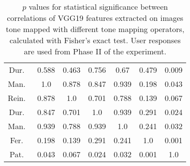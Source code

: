 \begin{table}[ht]
{\begin{tabular}{c|c c c c c c}
Dur.~\cite{durand2002fast}  &0.588 &0.463 &0.756 &0.67 &0.479 &0.009 \\ 
Man.~\cite{mantiuk2006perceptual} &1.0 &0.878 &0.847 &0.939 &0.198 &0.043 \\ 
Rein.~\cite{reinhard2005dynamic}  &0.878 &1.0 &0.701 &0.788 &0.139 &0.067 \\ 
Dur.~\cite{durand2002fast}  &0.847 &0.701 &1.0 &0.939 &0.291 &0.024 \\ 
Man.~\cite{mantiuk2008display} &0.939 &0.788 &0.939 &1.0 &0.241 &0.032 \\ 
Fer.~\cite{ferradans2011analysis}  &0.198 &0.139 &0.291 &0.241 &1.0 &0.001 \\ 
Pat.~\cite{pattanaik2000time}  &0.043 &0.067 &0.024 &0.032 &0.001 &1.0 \\ 
\end{tabular}}
\caption{$p$ values for statistical significance between correlations of VGG19 features extracted on images tone mapped with different tone mapping operators, calculated with Fisher's exact test. User responses are used from Phase II of the experiment.}
\label{tab:p_tmos}
\end{table}


